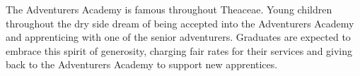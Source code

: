 The Adventurers Academy is famous throughout Theaceae.
Young children throughout the dry side dream of being accepted into the Adventurers Academy and apprenticing with one of the senior adventurers.
Graduates are expected to embrace this spirit of generosity, charging fair rates for their services and giving back to the Adventurers Academy to support new apprentices.
